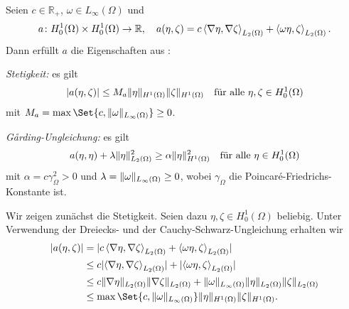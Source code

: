 \begin{Lemma}
\label{lemma:a_bf_bounded_garding}
    Seien $c \in \mathbb{R}_{+}$, $\omega \in L_{\infty}(\Omega)$ und
    \begin{equation}
    \label{eq:bf_a}
        a \colon H^{1}_{0}(\Omega) \times H^{1}_{0}(\Omega) \to \mathbb{R}, \quad a(\eta, \zeta) = c \left\langle\nabla \eta,\nabla \zeta\right\rangle_{L_{2}(\Omega)} + \left\langle\omega \eta,\zeta\right\rangle_{L_{2}(\Omega)}.
    \end{equation}
    Dann erfüllt $a$ die Eigenschaften aus :
    \begin{thmenumerate}
        \item\label{lemma:a_bf_bounded_garding:1}
        \emph{Stetigkeit:} es gilt
        \begin{equation}
            \lvert a(\eta, \zeta)\rvert \leq M_{a} \lVert\eta\rVert_{H^{1}(\Omega)} \lVert\zeta\rVert_{H^{1}(\Omega)} \quad \text{für alle}~\eta, \zeta \in H^{1}_{0}(\Omega)
        \end{equation}
        mit $M_{a} = \max\Set{c, \norm{\omega}_{L_{\infty}(\Omega)} } \geq 0$.
        \item\label{lemma:a_bf_bounded_garding:2}
        \emph{G\aa{}rding-Ungleichung:} es gilt
        \begin{equation}
                a(\eta, \eta) + \lambda \lVert\eta\rVert_{L_{2}(\Omega)}^{2} \geq \alpha \lVert\eta\rVert_{H^{1}(\Omega)}^{2} \quad \text{für alle}~\eta \in H^{1}_{0}(\Omega)
        \end{equation}
        mit $\alpha = c \gamma_{\Omega}^{2} > 0$ und $\lambda = \lVert\omega\rVert_{L_{\infty}(\Omega)} \geq 0$, wobei $\gamma_{\Omega}$ die Poincaré-Friedrichs-Konstante ist.
    \end{thmenumerate}

    \begin{Beweis}
    Wir zeigen zunächst die Stetigkeit.
    Seien dazu $\eta, \zeta \in H^{1}_{0}(\Omega)$ beliebig.
    Unter Verwendung der Dreiecks- und der Cauchy-Schwarz-Ungleichung erhalten wir
    \begin{align}
        \abs{a(\eta, \zeta)}
        &= \abs{c \skprod{\grad \eta}{\grad \zeta}_{L_{2}(\Omega)} + \skprod{\omega \eta}{\zeta}_{L_{2}(\Omega)}}
        \\&\leq c \abs{\skprod{\grad \eta}{\grad \zeta}_{L_{2}(\Omega)}} + \abs{\skprod{\omega \eta}{\zeta}_{L_{2}(\Omega)}}
        \\&\leq c \norm{\grad \eta}_{L_{2}(\Omega)} \norm{\grad \zeta}_{L_{2}(\Omega)} + \norm{\omega}_{L_{\infty}(\Omega)} \norm{\eta}_{L_{2}(\Omega)} \norm{\zeta}_{L_{2}(\Omega)}
        \\&\leq \max \Set{ c, \norm{\omega}_{L_{\infty}(\Omega)} } \norm{\eta}_{H^{1}(\Omega)} \norm{\zeta}_{H^{1}(\Omega)}.
    \end{align}


\end{Beweis}
\end{Lemma}
